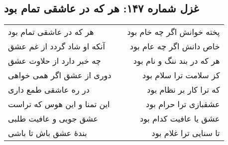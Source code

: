 \begin{center}
\section*{غزل شماره ۱۴۷: هر که در عاشقی تمام بود}
\label{sec:147}
\begin{longtable}{l p{0.5cm} r}
هر که در عاشقی تمام بود
&&
پخته خوانش اگر چه خام بود
\\
آنکه او شاد گردد از غم عشق
&&
خاص دانش اگر چه عام بود
\\
چه خبر دارد از حلاوت عشق
&&
هر که در بند ننگ و نام بود
\\
دوری از عشق اگر همی خواهی
&&
کز سلامت ترا سلام بود
\\
در ره عاشقی طمع داری
&&
که ترا کار بر نظام بود
\\
این تمنا و این هوس که تراست
&&
عشقبازی ترا حرام بود
\\
عشق جویی و عافیت طلبی
&&
عشق یا عافیت کدام بود
\\
بندهٔ عشق باش تا باشی
&&
تا سنایی ترا غلام بود
\\
\end{longtable}
\end{center}
